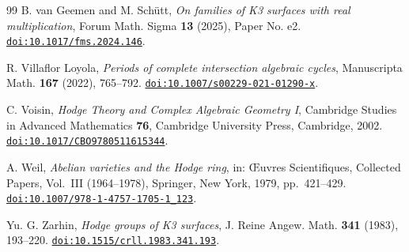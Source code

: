 \begin{thebibliography}{99}
B. van Geemen and M. Sch\"utt,
\emph{On families of K3 surfaces with real multiplication},
Forum Math. Sigma \textbf{13} (2025), Paper No. e2.
\href{https://doi.org/10.1017/fms.2024.146}{\nolinkurl{doi:10.1017/fms.2024.146}}.

R. Villaflor Loyola,
\emph{Periods of complete intersection algebraic cycles},
Manuscripta Math. \textbf{167} (2022), 765--792.
\href{https://doi.org/10.1007/s00229-021-01290-x}{\nolinkurl{doi:10.1007/s00229-021-01290-x}}.

C. Voisin,
\emph{Hodge Theory and Complex Algebraic Geometry I},
Cambridge Studies in Advanced Mathematics \textbf{76},
Cambridge University Press, Cambridge, 2002.
\href{https://doi.org/10.1017/CBO9780511615344}{\nolinkurl{doi:10.1017/CBO9780511615344}}.

A. Weil,
\emph{Abelian varieties and the Hodge ring},
in: \OE uvres Scientifiques, Collected Papers, Vol.~III (1964--1978),
Springer, New York, 1979, pp.~421--429.
\href{https://doi.org/10.1007/978-1-4757-1705-1_123}{\nolinkurl{doi:10.1007/978-1-4757-1705-1_123}}.

Yu. G. Zarhin,
\emph{Hodge groups of K3 surfaces},
J. Reine Angew. Math. \textbf{341} (1983), 193--220.
\href{https://doi.org/10.1515/crll.1983.341.193}{\nolinkurl{doi:10.1515/crll.1983.341.193}}.

\end{thebibliography}
